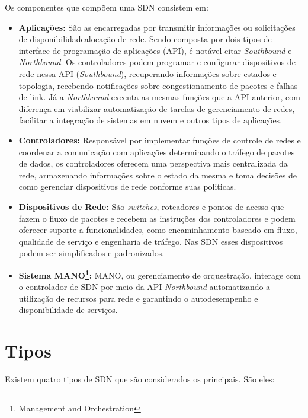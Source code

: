 Os componentes que compõem uma SDN consistem em:
\begin{itemize}
	\item \textbf{Aplicações:} São as encarregadas por transmitir informações ou solicitações de disponibilidadealocação
	de rede. Sendo composta por dois tipos de interface de programação de aplicações (API), é notável citar
	\textit{Southbound} e \textit{Northbound}. Os controladores podem programar e configurar dispositivos de rede nessa
	API (\textit{Southbound}), recuperando informações sobre estados e topologia, recebendo notificações sobre congestionamento de pacotes
	e falhas de link. Já a \textit{Northbound} executa as mesmas funções que a API anterior, com diferença em viabilizar automatização de tarefas
	de gerenciamento de redes, facilitar a integração de sistemas em nuvem e outros tipos de aplicações.
	\item \textbf{Controladores:} Responsável por implementar funções de controle de redes e coordenar a comunicação com aplicações determinando
	o tráfego de pacotes de dados, os controladores oferecem uma perspectiva mais centralizada da rede, armazenando informações sobre o estado da
	mesma e toma decisões de como gerenciar dispositivos de rede conforme suas politicas.
	\item \textbf{Dispositivos de Rede:} São \textit{switches}, roteadores e pontos de acesso que fazem o fluxo de pacotes e recebem as instruções dos controladores e podem oferecer suporte a funcionalidades, como encaminhamento baseado em fluxo, qualidade de serviço e engenharia de tráfego. Nas SDN esses dispositivos podem ser simplificados e padronizados.
	\item \textbf{Sistema MANO\footnote{Management and Orchestration}:} MANO, ou gerenciamento de orquestração, interage com o controlador de SDN por meio da API \textit{Northbound}
	automatizando a utilização de recursos para rede e garantindo o autodesempenho e disponibilidade de serviços.
\end{itemize}
\cite{redhat_sdn}

\section{Tipos}
Existem quatro tipos de SDN que são considerados os principais. São eles:

